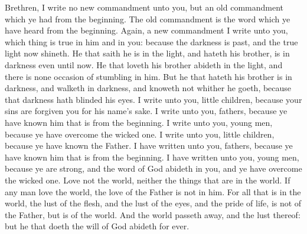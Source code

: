  Brethren, I write no new commandment unto you, but an old
commandment which ye had from the beginning. The old commandment is the
word which ye have heard from the beginning.  Again, a new
commandment I write unto you, which thing is true in him and in you:
because the darkness is past, and the true light now shineth.
 He that saith he is in the light, and hateth his brother,
is in darkness even until now.  He that loveth his
brother abideth in the light, and there is none occasion of stumbling in
him.  But he that hateth his brother is in darkness, and
walketh in darkness, and knoweth not whither he goeth, because that
darkness hath blinded his eyes.  I write unto you, little
children, because your sins are forgiven you for his name's sake.
 I write unto you, fathers, because ye have known him
that is from the beginning. I write unto you, young men, because ye have
overcome the wicked one. I write unto you, little children, because ye
have known the Father.  I have written unto you, fathers,
because ye have known him that is from the beginning. I have written
unto you, young men, because ye are strong, and the word of God abideth
in you, and ye have overcome the wicked one.  Love not
the world, neither the things that are in the world. If any man love the
world, the love of the Father is not in him.  For all
that is in the world, the lust of the flesh, and the lust of the eyes,
and the pride of life, is not of the Father, but is of the world.
 And the world passeth away, and the lust thereof: but he
that doeth the will of God abideth for ever.

